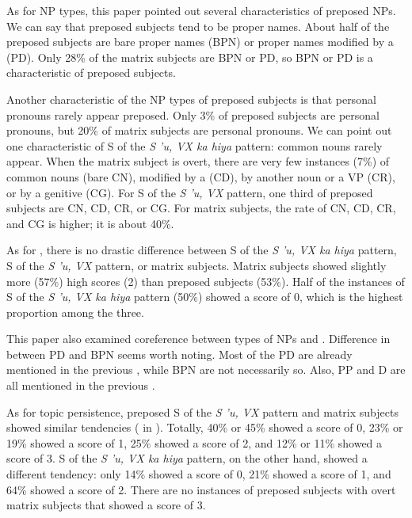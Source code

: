 \documentclass[output=paper
,modfonts
,nonflat]{langsci/langscibook}
\begin{document}
As for NP types, this paper pointed out several characteristics of preposed NPs. We can say that preposed subjects tend to be proper names. About half of the preposed subjects are bare proper names (BPN) or proper names modified by a  (PD). Only 28\% of the matrix subjects are BPN or PD, so BPN or PD is a characteristic of preposed subjects. 

Another characteristic of the NP types of preposed subjects is that personal pronouns rarely appear preposed. Only 3\% of preposed subjects are personal pronouns, but 20\% of matrix subjects are personal pronouns. 
\newpage
We can point out one characteristic of S of the \textit{S 'u, VX ka hiya} pattern: common nouns rarely appear. When the matrix subject is overt, there are very few instances (7\%) of common nouns (bare CN), modified by a  (CD), by another noun or a VP (CR), or by a genitive  (CG). For S of the \textit{S 'u, VX} pattern, one third of preposed subjects are CN, CD, CR, or CG. For matrix subjects, the rate of CN, CD, CR, and CG is higher; it is about 40\%. 

As for , there is no drastic difference between S of the \textit{S 'u, VX ka hiya} pattern, S of the \textit{S 'u, VX} pattern, or matrix subjects. Matrix subjects showed slightly more (57\%) high scores (2) than preposed subjects (53\%). Half of the instances of S of the \textit{S 'u, VX ka hiya} pattern (50\%) showed a score of 0, which is the highest proportion among the three. 

This paper also examined coreference between types of NPs and . Difference in  between PD and BPN seems worth noting. Most of the PD are already mentioned in the previous , while BPN are not necessarily so. Also, PP and D are all mentioned in the previous . 

As for topic persistence, preposed S of the \textit{S 'u, VX} pattern and matrix subjects showed similar tendencies ( in ). Totally, 40\% or 45\% showed a score of 0, 23\% or 19\% showed a score of 1, 25\% showed a score of 2, and 12\% or 11\% showed a score of 3. S of the \textit{S 'u, VX ka hiya} pattern, on the other hand, showed a different tendency: only 14\% showed a score of 0, 21\% showed a score of 1, and 64\% showed a score of 2. There are no instances of preposed subjects with overt matrix subjects that showed a score of 3.
\end{document}
